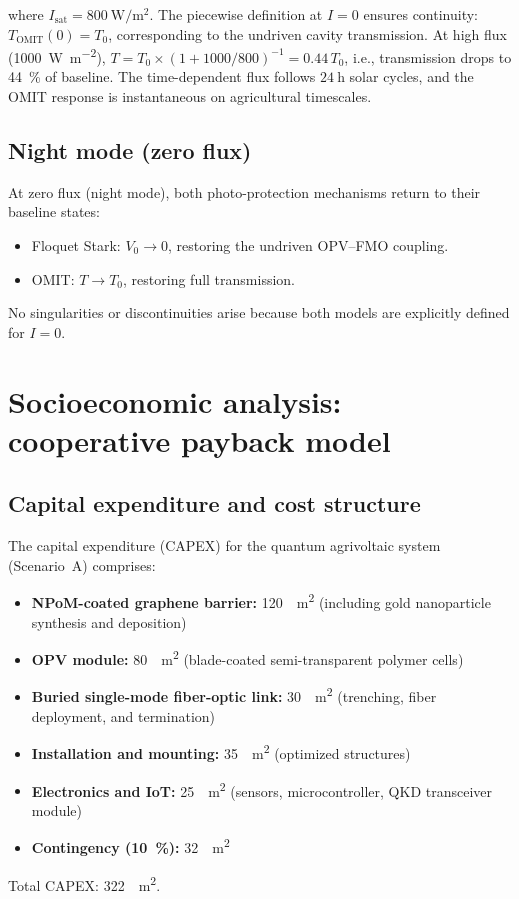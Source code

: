 \documentclass[11pt,a4paper]{article}
\begin{document}
where $I_{\mathrm{sat}} = \qty{800}{\W\per\m\squared}$.
The piecewise definition at $I=0$ ensures continuity: $T_{\mathrm{OMIT}}(0) = T_0$, corresponding to the undriven cavity transmission.
At high flux (\qty{1000}{\W\per\m\squared}), $T = T_0 \times (1 + 1000/800)^{-1} = 0.44\,T_0$, i.e., transmission drops to \qty{44}{\percent} of baseline.
The time-dependent flux follows $\qty{24}{\hour}$ solar cycles, and the OMIT response is instantaneous on agricultural timescales.

\subsection{Night mode (zero flux)}

At zero flux (night mode), both photo-protection mechanisms return to their baseline states:
\begin{itemize}
\item Floquet Stark: $V_0 \to 0$, restoring the undriven OPV--FMO coupling.
\item OMIT: $T \to T_0$, restoring full transmission.
\end{itemize}
No singularities or discontinuities arise because both models are explicitly defined for $I=0$.


\section{Socioeconomic analysis: cooperative payback model}
\label{SI-sec:socioeconomic}

\subsection{Capital expenditure and cost structure}

The capital expenditure (CAPEX) for the quantum agrivoltaic system (Scenario~A) comprises:
\begin{itemize}
\item \textbf{NPoM-coated graphene barrier:} \qty{120}{\per\m\squared} (including gold nanoparticle synthesis and deposition)
\item \textbf{OPV module:} \qty{80}{\per\m\squared} (blade-coated semi-transparent polymer cells)
\item \textbf{Buried single-mode fiber-optic link:} \qty{30}{\per\m\squared} (trenching, fiber deployment, and termination)
\item \textbf{Installation and mounting:} \qty{35}{\per\m\squared} (optimized structures)
\item \textbf{Electronics and IoT:} \qty{25}{\per\m\squared} (sensors, microcontroller, QKD transceiver module)
\item \textbf{Contingency (\qty{10}{\percent}):} \qty{32}{\per\m\squared}
\end{itemize}
Total CAPEX: \qty{322}{\per\m\squared}.
\end{document}
